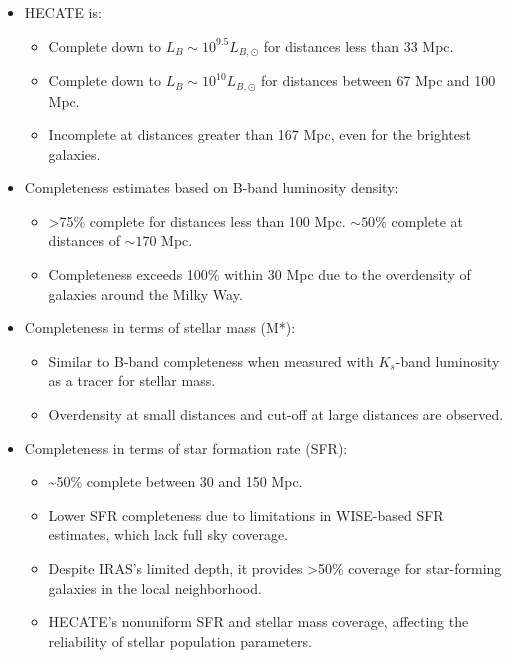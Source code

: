 \documentclass[
]{article}
\begin{document}
\begin{itemize}
\item
  HECATE is:

  \begin{itemize}
  \item
    Complete down to \(L_B\sim 10^{9.5} L_{B,\odot}\) for distances less
    than 33 Mpc.
  \item
    Complete down to \(L_B\sim 10^{10} L_{B,\odot}\) for distances
    between 67 Mpc and 100 Mpc.
  \item
    Incomplete at distances greater than 167 Mpc, even for the brightest
    galaxies.
  \end{itemize}
\item
  Completeness estimates based on B-band luminosity density:

  \begin{itemize}
  \item
    \textgreater75\% complete for distances less than 100 Mpc.
    \(\sim 50\%\) complete at distances of \(\sim170\) Mpc.
  \item
    Completeness exceeds 100\% within 30 Mpc due to the overdensity of
    galaxies around the Milky Way.
  \end{itemize}
\item
  Completeness in terms of stellar mass (M*):

  \begin{itemize}
  \item
    Similar to B-band completeness when measured with \(K_s\)-band
    luminosity as a tracer for stellar mass.
  \item
    Overdensity at small distances and cut-off at large distances are
    observed.
  \end{itemize}
\item
  Completeness in terms of star formation rate (SFR):

  \begin{itemize}
  \item
    \textasciitilde50\% complete between 30 and 150 Mpc.
  \item
    Lower SFR completeness due to limitations in WISE-based SFR
    estimates, which lack full sky coverage.
  \item
    Despite IRAS's limited depth, it provides \textgreater50\% coverage
    for star-forming galaxies in the local neighborhood.
  \item
    HECATE's nonuniform SFR and stellar mass coverage, affecting the
    reliability of stellar population parameters.
  \end{itemize}
\end{itemize}
\end{document}
